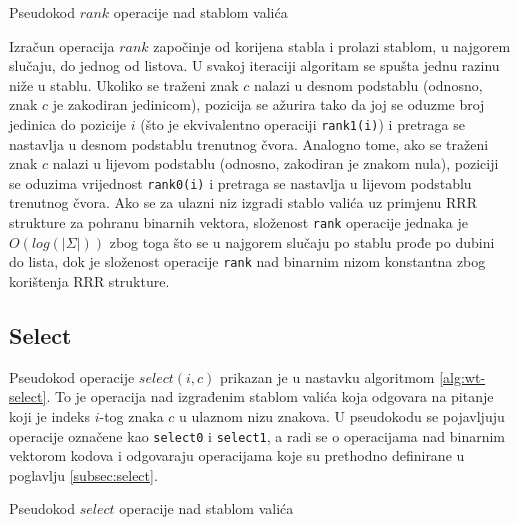 \documentclass[times, utf8, seminar, numeric]{fer}
\begin{document}
\begin{algorithm}[H]
 \caption{Pseudokod $rank$ operacije nad stablom valića}
 \label{alg:wt-rank}
\end{algorithm}

Izračun operacija $rank$ započinje od korijena stabla i prolazi stablom, u najgorem slučaju, do jednog od listova. U svakoj iteraciji algoritam se spušta jednu razinu niže u stablu. Ukoliko se traženi znak $c$ nalazi u desnom podstablu (odnosno, znak $c$ je zakodiran jedinicom), pozicija se ažurira tako da joj se oduzme broj jedinica do pozicije $i$ (što je ekvivalentno operaciji \texttt{rank1(i)}) i pretraga se nastavlja u desnom podstablu trenutnog čvora. Analogno tome, ako se traženi znak $c$ nalazi u lijevom podstablu (odnosno, zakodiran je znakom nula), poziciji se oduzima vrijednost \texttt{rank0(i)} i pretraga se nastavlja u lijevom podstablu trenutnog čvora. Ako se za ulazni niz izgradi stablo valića uz primjenu RRR strukture za pohranu binarnih vektora, složenost \texttt{rank} operacije jednaka je $O(log(|\Sigma|))$ zbog toga što se u najgorem slučaju po stablu prođe po dubini do lista, dok je složenost operacije \texttt{rank} nad binarnim nizom konstantna zbog korištenja RRR strukture.

\subsection{Select}
Pseudokod operacije $select(i, c)$ prikazan je u nastavku algoritmom \ref{alg:wt-select}. To je operacija nad izgrađenim stablom valića koja odgovara na pitanje koji je indeks $i$-tog znaka $c$ u ulaznom nizu znakova. U pseudokodu se pojavljuju operacije označene kao \texttt{select0} i \texttt{select1}, a radi se o operacijama nad binarnim vektorom kodova i odgovaraju operacijama koje su prethodno definirane u poglavlju \ref{subsec:select}.

\begin{algorithm}[H]
 \caption{Pseudokod $select$ operacije nad stablom valića}
 \label{alg:wt-select}
\end{algorithm}
\end{document}
